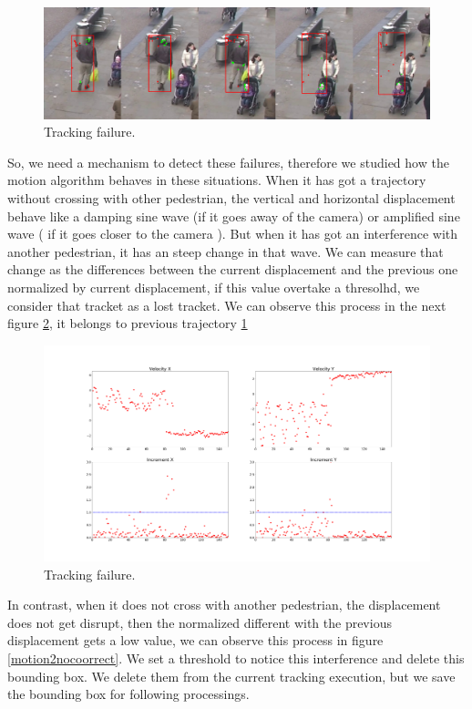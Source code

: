 \documentclass[12pt, a4paper, titlepage,twoside,openright]{article}
\begin{document}
\begin{figure}[H]
\centering         
\includegraphics[width=0.9\linewidth]{velocidadas/mateuPont.png}
\caption{Tracking failure.} \label{traccs}
\end{figure}


So, we need a mechanism to detect these failures, therefore we studied how the motion algorithm behaves in these situations. When it has got a trajectory without crossing with other pedestrian, the vertical and horizontal displacement behave like a damping sine wave (if it goes away of the camera)  or amplified sine wave ( if it goes closer to the camera ). But when it has got an interference with another pedestrian, it has an steep change in that wave. We can measure that change as the differences between the current displacement and the previous one normalized by current displacement, if this value overtake a thresolhd, we consider that tracket as a lost tracket. We can observe this process in the next figure \ref{traccs23}, it belongs to previous trajectory \ref{traccs} 


\begin{figure}[H]
\centering         
\includegraphics[width=0.9\linewidth]{velocidadas/bad_threshold.png}
\caption{Tracking failure.} \label{traccs23}
\end{figure}


In contrast, when it does not cross with another pedestrian, the displacement does not get disrupt, then the normalized different with the previous displacement gets a low value, we can observe this process in figure \ref{motion2nocoorrect}. We set a threshold to notice this interference and delete this bounding box. We delete them from the current tracking execution, but we save the bounding box for following processings.
\end{document}
